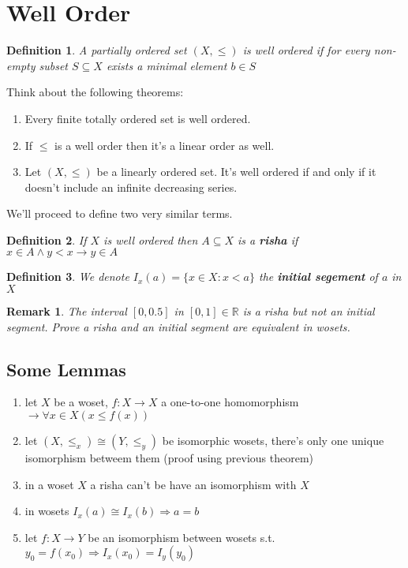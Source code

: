 \documentclass{article}
\newcommand{\R}{\mathbb{R}}
\theoremstyle{plain}
\newtheorem{definition}{Definition}[section]
\newtheorem{remark}{Remark}[section]
\begin{document}
\section{Well Order}
\begin{definition}
A partially ordered set $(X,\le)$ is well ordered if for every non-empty
subset $S \subseteq X$ exists a minimal element $b\in S$
\end{definition}
	\noindent Think about the following theorems:
	\begin{enumerate}
	\item Every finite totally ordered set is well ordered.
	\item If $\le$ is a well order then it's a linear order as well.
	\item Let  $(X,\le)$ be a linearly ordered set. It's well ordered
	if and only if it doesn't include an infinite decreasing series.
	\end{enumerate}
	We'll proceed to define two very similar terms.
	\begin{definition}
	If $X$ is well ordered then $A\subseteq X$ is a \textbf{risha} 
	if $x \in A\land y < x \rightarrow y \in A$
	\end{definition}
	\begin{definition}
	We denote $I_x(a) = \{x\in X:x<a\}$ the \textbf{initial segement} of 
	$a$ in $X$
	\end{definition}
	\begin{remark}
	The interval $[0,0.5]$ in $[0,1]\in\R$ is a risha but not an initial 
	segment. Prove a risha and an initial segment are equivalent in wosets.
	\end{remark}
	
	\subsection{Some Lemmas}
	\begin{enumerate}
	\item let $X$ be a woset, $f:X\rightarrow X$ a one-to-one homomorphism 
	$\rightarrow \forall x\in X(x\le f(x))$
	\item let $(X,\le_x)\cong(Y,\le_y)$ be isomorphic wosets, there's only 
	one unique isomorphism betweem them (proof using previous theorem)
	\item in a woset $X$ a risha can't be have an isomorphism with $X$
	\item in wosets $I_x(a)\cong I_x(b) \Rightarrow a=b$
	\item let $f:X\rightarrow Y$ be an isomorphism between wosets 
	s.t. $y_0=f(x_0) \Rightarrow I_x(x_0)=I_y(y_0)$
	\end{enumerate}
\end{document}

